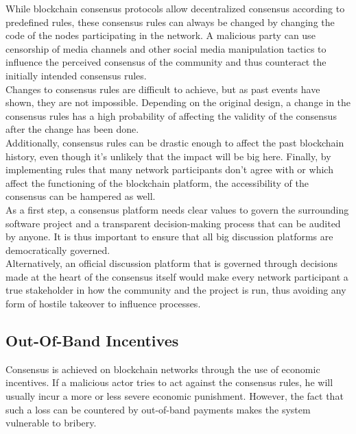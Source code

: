 \documentclass[11pt,a4paper]{article}
\begin{document}
While blockchain consensus protocols allow decentralized consensus according to predefined rules, these consensus rules can always be changed by changing the code of the nodes participating in the network. A malicious party can use censorship of media channels and other social media manipulation tactics to influence the perceived consensus of the community and thus counteract the initially intended consensus rules.\\

Changes to consensus rules are difficult to achieve, but as past events have shown, they are not impossible. Depending on the original design, a change in the consensus rules has a high probability of affecting the validity of the consensus after the change has been done.\\

Additionally, consensus rules can be drastic enough to affect the past blockchain history, even though it's unlikely that the impact will be big here. Finally, by implementing rules that many network participants don't agree with or which affect the functioning of the blockchain platform, the accessibility of the consensus can be hampered as well.\\

As a first step, a consensus platform needs clear values to govern the surrounding software project and a transparent decision-making process that can be audited by anyone. It is thus important to ensure that all big discussion platforms are democratically governed.\\

Alternatively, an official discussion platform that is governed through decisions made at the heart of the consensus itself would make every network participant a true stakeholder in how the community and the project is run, thus avoiding any form of hostile takeover to influence processes.\\

\subsection{Out-Of-Band Incentives}

Consensus is achieved on blockchain networks through the use of economic incentives. If a malicious actor tries to act against the consensus rules, he will usually incur a more or less severe economic punishment. However, the fact that such a loss can be countered by out-of-band payments makes the system vulnerable to bribery.\\
\end{document}
